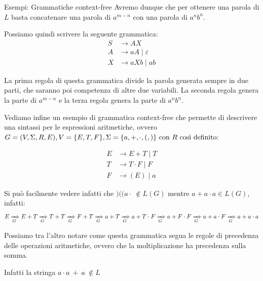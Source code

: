 \begin{generalbox}[colframe=azure-gradient-3!90!black]{Esempi: Grammatiche context-free}
  Avremo dunque che per ottenere una parola di $L$ basta concatenare una parola di $a^{m-n}$ con una parola di $a^{n}b^{n}$.

  \medskip

  Possiamo quindi scrivere la seguente grammatica:
  \begin{equation}
    \begin{split}
      S &\to AX\\
      A &\to aA \mid \varepsilon \\
      X &\to aXb \mid ab
    \end{split}
  \end{equation}

  La prima regola di questa grammatica divide la parola generata sempre in due parti, che saranno poi competenza di altre due variabili. La seconda regola genera la parte di $a^{m-n}$ e la terza regola genera la parte di $a^{n}b^{n}$.

  \bigskip

  Vediamo infine un esempio di grammatica context-free che permette di descrivere una sintassi per le espressioni aritmetiche, ovvero $G=\displaystyle{\left({V,\Sigma,R,E}\right)}, V=\displaystyle{\left\{{E,T,F}\right\}}, \Sigma=\displaystyle{\left\{{a,+,\cdot,(,)}\right\}} \text{ con } R \text{ così definito:}$

  \begin{equation}
    \begin{split}
      E &\to E + T \mid T\\
      T &\to T \cdot F \mid F\\
      F &\to (E) \mid a
    \end{split}
  \end{equation}

  Si può facilmente vedere infatti che $)(( a \cdot\ \nin L(G)$ mentre $a + a \cdot a \in L(G)$, infatti:
  \begin{equation}
      E \xRightarrow[G]{} E + T \xRightarrow[G]{} T + T \xRightarrow[G]{} F + T \xRightarrow[G]{} a + T \xRightarrow[G]{} a + T \cdot F \xRightarrow[G]{} a + F \cdot F \xRightarrow[G]{} a + a \cdot F \xRightarrow[G]{} a + a \cdot a
  \end{equation}

  Possiamo tra l'altro notare come questa grammatica segua le regole di precedenza delle operazioni aritmetiche, ovvero che la moltiplicazione ha precedenza sulla somma.

  Infatti la stringa $a \cdot a\ +\ a\ \nin L$
\end{generalbox}


